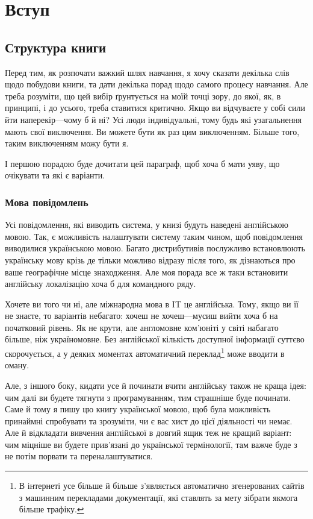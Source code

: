 \chapter*{Вступ}

\section*{Структура книги}

Перед тим, як розпочати важкий шлях навчання, я хочу сказати декілька слів щодо побудови книги, та дати декілька порад щодо самого процесу навчання.
Але треба розуміти, що цей вибір ґрунтується на моїй точці зору, до якої, як, в принципі, і до усього, треба ставитися критично.
Якщо ви відчуваєте у собі сили йти наперекір---чому б й ні?
Усі люди індивідуальні, тому будь які узагальнення мають свої виключення.
Ви можете бути як раз цим виключенням.
Більше того, таким виключенням можу бути я.

І першою порадою буде дочитати цей параграф, щоб хоча б мати уяву, що очікувати та які є варіанти.

\subsection*{Мова повідомлень}

Усі повідомлення, які виводить система, у книзі будуть наведені англійською мовою.
Так, є можливість налаштувати систему таким чином, щоб повідомлення виводилися українською мовою.
Багато дистрибутивів послужливо встановлюють українську мову крізь де тільки можливо відразу після того, як дізнаються про ваше географічне місце знаходження.
Але моя порада все ж таки встановити англійську локалізацію хоча б для командного ряду.

Хочете ви того чи ні, але міжнародна мова в IT це англійська.
Тому, якщо ви її не знаєте, то варіантів небагато: хочеш не хочеш---мусиш вийти хоча б на початковий рівень.
Як не крути, але англомовне ком'юніті у світі набагато більше, ніж україномовне.
Без англійської кількість доступної інформації суттєво скорочується, а у деяких моментах автоматичний переклад\footnote{
В інтернеті усе більше й більше з'являється автоматично згенерованих сайтів з машинним перекладами документації, які ставлять за мету зібрати якмога більше трафіку.
} може вводити в оману.

Але, з іншого боку, кидати усе й починати вчити англійську також не краща ідея: чим далі ви будете тягнути з програмуванням, тим страшніше буде починати.
Саме й тому я пишу цю книгу української мовою, щоб була можливість принаймні спробувати та зрозуміти, чи є вас хист до цієї діяльності чи немає.
Але й відкладати вивчення англійської в довгий ящик теж не кращий варіант: чим міцніше ви будете прив'язані до української термінології, там важче буде з не потім порвати та переналаштуватися.

